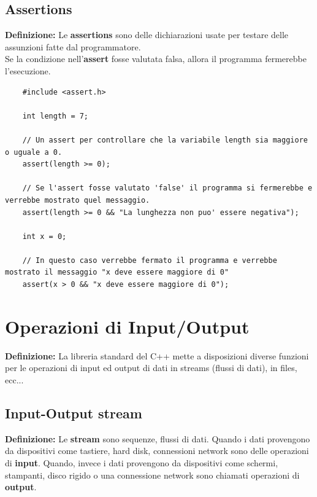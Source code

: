 \subsection{Assertions}

\textsf{\small \textbf{Definizione: } Le \textbf{assertions} sono delle dichiarazioni usate per testare delle assunzioni fatte dal programmatore.} \\

\textsf{\small Se la condizione nell'\textbf{assert} fosse valutata falsa, allora il programma fermerebbe l'esecuzione.} \\

\begin{lstlisting}
	#include <assert.h>
	
	int length = 7;
	
	// Un assert per controllare che la variabile length sia maggiore o uguale a 0.
	assert(length >= 0);
	
	// Se l'assert fosse valutato 'false' il programma si fermerebbe e verrebbe mostrato quel messaggio.
	assert(length >= 0 && "La lunghezza non puo' essere negativa");
	
	int x = 0;
	
	// In questo caso verrebbe fermato il programma e verrebbe mostrato il messaggio "x deve essere maggiore di 0"
	assert(x > 0 && "x deve essere maggiore di 0"); 
\end{lstlisting}


\newpage

\section{Operazioni di Input/Output}

\textsf{\small \textbf{Definizione: } La libreria standard del C++ mette a disposizioni diverse funzioni per le operazioni di input ed output di dati in streams (flussi di dati), in files, ecc...} \\

\subsection{Input-Output stream}

\textsf{\small \textbf{Definizione: } Le \textbf{stream} sono sequenze, flussi di dati. Quando i dati provengono da dispositivi come tastiere, hard disk, connessioni network sono delle operazioni di \textbf{input}. Quando, invece i dati provengono da dispositivi come schermi, stampanti, disco rigido o una connessione network sono chiamati operazioni di \textbf{output}.} \break

